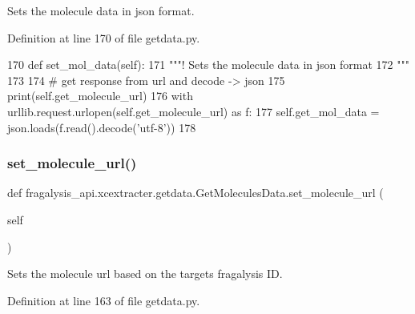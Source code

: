 Sets the molecule data in json format. 



Definition at line 170 of file getdata.\+py.


\begin{DoxyCode}
170     \textcolor{keyword}{def }set\_mol\_data(self):
171         \textcolor{stringliteral}{"""! Sets the molecule data in json format}
172 \textcolor{stringliteral}{        """}
173 
174         \textcolor{comment}{# get response from url and decode -> json}
175         print(self.get\_molecule\_url)
176         with urllib.request.urlopen(self.get\_molecule\_url) \textcolor{keyword}{as} f:
177             self.get\_mol\_data = json.loads(f.read().decode(\textcolor{stringliteral}{'utf-8'}))
178 
\end{DoxyCode}
\mbox{\label{classfragalysis__api_1_1xcextracter_1_1getdata_1_1_get_molecules_data_a61f7510bc705fab0ee33128872619f40}} 
\subsubsection{\texorpdfstring{set\+\_\+molecule\+\_\+url()}{set\_molecule\_url()}}
{\footnotesize\ttfamily def fragalysis\+\_\+api.\+xcextracter.\+getdata.\+Get\+Molecules\+Data.\+set\+\_\+molecule\+\_\+url (\begin{DoxyParamCaption}\item[{}]{self }\end{DoxyParamCaption})}



Sets the molecule url based on the targets fragalysis ID. 



Definition at line 163 of file getdata.\+py.


